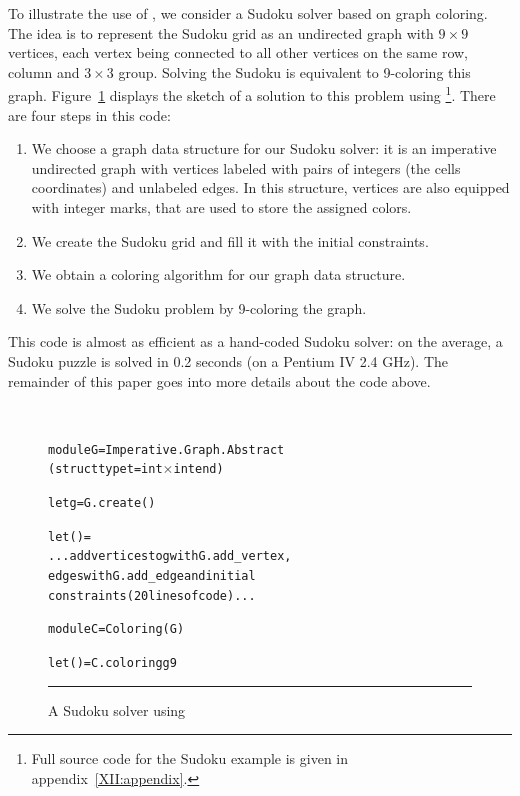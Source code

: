To illustrate the use of \ocamlgraph, we consider a Sudoku solver
based on graph 
coloring.  The idea is to represent the Sudoku grid as an undirected
graph with $9\times 9$ vertices, each vertex being connected to all
other vertices on the same row, column and $3\times 3$ group.
Solving the Sudoku is equivalent to 9-coloring this graph.
Figure~\ref{XII:fig:sudoku} displays the sketch of a solution to
this problem using \ocamlgraph\footnote{Full source code for the
  Sudoku example is given in appendix~\ref{XII:appendix}.}. There are
four steps in this code:
\begin{enumerate}
\item We choose a graph data structure for our Sudoku solver: it is an
  imperative undirected graph with vertices labeled with pairs of
  integers (the cells coordinates) and unlabeled edges. 
  In this structure, vertices are also
  equipped with integer marks, that are used to store the assigned
  colors.
\item We create the Sudoku grid and fill it with the initial
  constraints.
\item We obtain a coloring algorithm for our graph data structure.
\item We solve the Sudoku problem by 9-coloring the graph.
\end{enumerate}
This code is almost as efficient as a hand-coded Sudoku solver: on the
average, a Sudoku puzzle is solved in 0.2 seconds (on a Pentium IV 2.4
GHz).  The remainder of this paper goes into more details about the
code above.

\begin{figure}[t]
\hrulefill\\[-2em]
\begin{center}
\begin{alltt}
module G = Imperative.Graph.Abstract
             (struct type t = int \ensuremath{\times} int end) 

let g = G.create ()

let () = 
  ... add vertices to g with G.add_vertex,
      edges with G.add_edge and initial
      constraints (20 lines of code) ...

module C = Coloring(G)       

let () = C.coloring g 9
\end{alltt}
\end{center}
\hrule

  \caption{A Sudoku solver using \ocamlgraph}
  \label{XII:fig:sudoku}
\end{figure}
 


